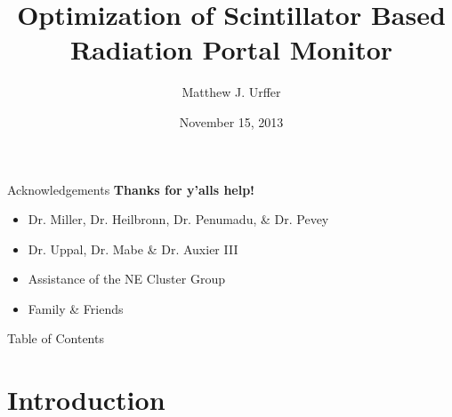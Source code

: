 \documentclass[compress]{beamer}
\title[Dissertation]{Optimization of Scintillator Based Radiation Portal Monitor}
\author[] { Matthew J. Urffer}
\institute[University of Tennessee] {Department of Nuclear Engineering, University of Tennessee, Knoxville, TN}
\date{November 15, 2013}
\begin{document}
\begin{frame}[plain]
  \titlepage
  \tiny
    \begin{center}
  \end{center}
\end{frame}
\begin{frame}{Acknowledgements}
\textbf{Thanks for y'alls help!}
\vspace{1cm}
  \begin{itemize}
    \item Dr. Miller, Dr. Heilbronn, Dr. Penumadu, \& Dr. Pevey
    \item Dr. Uppal, Dr. Mabe \& Dr. Auxier III
    \item Assistance of the NE Cluster Group
    \item Family \& Friends
  \end{itemize}
\end{frame}
\begin{frame}{Table of Contents}
  \label{toc}
  \begin{multicols}{2}
    \tableofcontents
  \end{multicols}
\end{frame}


\section{Introduction}

\end{document}
